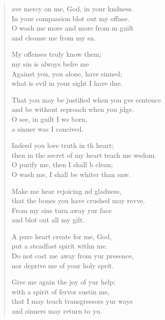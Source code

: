 \begin{verse}
  \begin{patverse}
    ave mercy on me, God, in your k\pointup{\i}ndness.\Med\\
In your compassion blot out my offnse.\\
O wash me more and more from m guilt\Med\\
and cleanse me from my s\pointup{\i}n.

My offenses truly  know them;\Med\\
my sin is always befre me\\
Against you, you alone, have  sinned;\Med\\
what is evil in your sight I have dne.

That you may be justified when you g\pointup{\i}ve sentence\Med\\
and be without reproach when you jdge.\\
O see, in guilt I ws born,\Med\\
a sinner was I concived.

Indeed you love truth in th heart;\Med\\
then in the secret of my heart teach me w\pointup{\i}sdom.\\
O purify me, then I shall b clean;\Med\\
O wash me, I shall be whiter than snw.

Make me hear rejoicing nd gladness,\Med\\
that the bones you have crushed may rev\pointup{\i}ve.\\
From my sins turn away yur face\Med\\
and blot out all my gilt.

A pure heart create for me,  God,\Med\\
put a steadfast spirit with\pointup{\i}n me.\\
Do not cast me away from yur presence,\Med\\
nor deprive me of your holy sp\pointup{\i}rit.

Give me again the joy of yur help;\Med\\
with a spirit of fervor sustin me,\\
that I may teach transgressors yur ways\Med\\
and sinners may return to yu.


\end{patverse}
\end{verse}
